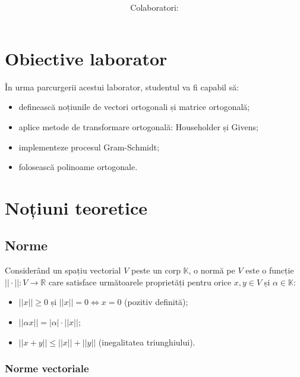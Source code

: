\documentclass{exam}
\title{
\textmd{\textbf{\MNLabTitle}}
\author{Colaboratori: \MNAuthor}
}
\begin{document}
\begin{coverpages}

	\maketitle
	\thispagestyle{empty}
	\tableofcontents

\end{coverpages}

\section{Obiective laborator}

\par În urma parcurgerii acestui laborator, studentul va fi capabil să:
\begin{itemize}
	\item definească noțiunile de vectori ortogonali și matrice ortogonală;
	\item aplice metode de transformare ortogonală: Householder și Givens;
	\item implementeze procesul Gram-Schmidt;
	\item folosească polinoame ortogonale.
\end{itemize}

\section{Noțiuni teoretice}

\subsection{Norme}

\par Considerând un spațiu vectorial $V$ peste un corp $\mathbb{K}$, o normă pe
$V$ este o funcție $||\cdot||: V \rightarrow \mathbb{R}$ care satisface
următoarele proprietăți pentru orice $x, y \in V$ și $\alpha \in \mathbb{K}$:

\begin{itemize}
	\item $||x|| \geq 0$ și $||x|| = 0 \Leftrightarrow x = 0$ (pozitiv definită);
	\item $||\alpha x|| = |\alpha| \cdot ||x||$;
	\item $||x + y|| \leq ||x|| + ||y||$ (inegalitatea triunghiului).
\end{itemize}

\subsubsection{Norme vectoriale}
\end{document}
